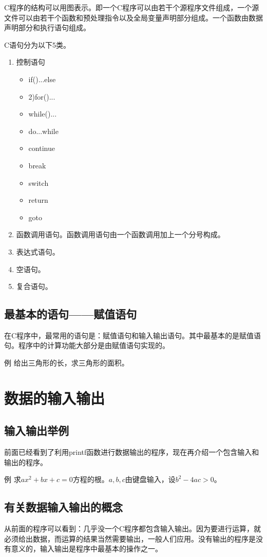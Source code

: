 C程序的结构可以用图表示。即一个C程序可以由若干个源程序文件组成，一个源文件可以由若干个函数和预处理指令以及全局变量声明部分组成。一个函数由数据声明部分和执行语句组成。

C语句分为以下5类。
\begin{enumerate}
	\item 控制语句
	\begin{itemize}
		\item if()...else
		\item 2)for()...
		\item while()...
		\item do...while
		\item continue
		\item break
		\item switch
		\item return 
		\item goto
	\end{itemize}
	\item 函数调用语句。函数调用语句由一个函数调用加上一个分号构成。
	\item 表达式语句。
	\item 空语句。
	\item 复合语句。
\end{enumerate}
\subsection{最基本的语句——赋值语句}
在C程序中，最常用的语句是：赋值语句和输入输出语句。其中最基本的是赋值语句。程序中的计算功能大部分是由赋值语句实现的。

例 给出三角形的长，求三角形的面积。

\section{数据的输入输出}
\subsection{输入输出举例}
前面已经看到了利用printf函数进行数据输出的程序，现在再介绍一个包含输入和输出的程序。

例 求$ax^2 + bx + c = 0$方程的根。$a, b, c$由键盘输入，设$b^2 - 4ac > 0$。
\subsection{有关数据输入输出的概念}
从前面的程序可以看到：几乎没一个C程序都包含输入输出。因为要进行运算，就必须给出数据，而运算的结果当然需要输出，一般人们应用。没有输出的程序是没有意义的，输入输出是程序中最基本的操作之一。

